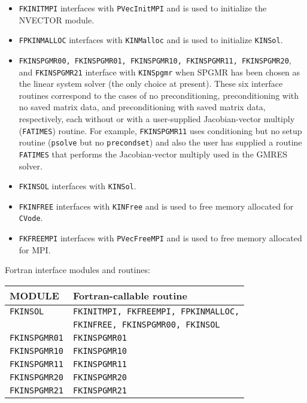 \documentclass[11pt]{article}
\begin{document}
\begin{itemize}
\item  {\tt FKINITMPI} interfaces with {\tt PVecInitMPI} and is used to
initialize the NVECTOR module.

\item  {\tt FPKINMALLOC} interfaces with {\tt KINMalloc} and is used to
initialize {\tt KINSol}.

\item {\tt FKINSPGMR00, FKINSPGMR01, FKINSPGMR10, FKINSPGMR11, FKINSPGMR20}, 
and \newline
{\tt FKINSPGMR21} interface with {\tt KINSpgmr} 
when SPGMR has been chosen as the linear system solver (the only choice at 
present). These six interface routines correspond to the cases of no 
preconditioning, preconditioning with no saved matrix data, and preconditioning
with saved matrix data, respectively, each  without or with a user-supplied 
Jacobian-vector multiply ({\tt FATIMES}) routine. For example, {\tt FKINSPGMR11}
uses conditioning but no setup routine ({\tt psolve} but no {\tt precondset}) 
and also the user has supplied a routine {\tt FATIMES} that performs the 
Jacobian-vector multiply    used in the GMRES solver.

\item  {\tt FKINSOL} interfaces with {\tt KINSol}.

\item  {\tt FKINFREE} interfaces with {\tt KINFree} and is used to free
memory allocated for {\tt CVode}.

\item  {\tt FKFREEMPI} interfaces with {\tt PVecFreeMPI} and is used to free
memory allocated for MPI.
\end{itemize}


 { Fortran interface modules and routines:} \label{fortran-interface}
\begin{table} [htb]
\begin{center}
\begin{tabular}{|l|l|} \hline
MODULE & Fortran-callable routine \\ \hline \hline
    
{\tt FKINSOL} & {\tt FKINITMPI, FKFREEMPI, FPKINMALLOC,} \\ 
           &{\tt FKINFREE, FKINSPGMR00, FKINSOL} \\ \hline
{\tt FKINSPGMR01}  &  {\tt FKINSPGMR01} \\ \hline
{\tt FKINSPGMR10}  &  {\tt FKINSPGMR10} \\ \hline
{\tt FKINSPGMR11}  &  {\tt FKINSPGMR11} \\ \hline
{\tt FKINSPGMR20}  &  {\tt FKINSPGMR20} \\ \hline
{\tt FKINSPGMR21}  &  {\tt FKINSPGMR21} \\ \hline
\end{tabular}
\end{center}
\end{table}
\end{document}
